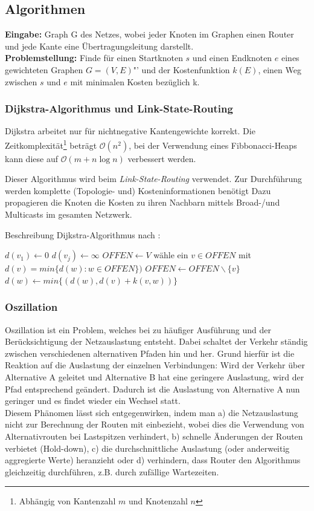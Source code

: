 \documentclass{article} %
\begin{document}
\subsection{Algorithmen}
\textbf{Eingabe:} Graph G des Netzes, wobei jeder Knoten im Graphen einen Router und jede Kante eine Übertragungsleitung darstellt.\\
\textbf{Problemstellung:} Finde für einen Startknoten $s$ und einen Endknoten $e$ eines gewichteten Graphen $G = (V,E)$"' und der Kostenfunktion $k(E)$, einen Weg zwischen $s$ und $e$ mit minimalen Kosten bezüglich k.
\subsubsection{Dijkstra-Algorithmus und Link-State-Routing}
Dijkstra arbeitet nur für nichtnegative Kantengewichte korrekt. 
Die Zeitkomplexität\footnote{Abhängig von Kantenzahl $m$ und Knotenzahl $n$} beträgt $\mathcal{O}(n^2)$, bei der Verwendung eines Fibbonacci-Heaps kann diese auf $\mathcal{O}(m + n \log{n})$ verbessert werden.

Dieser Algorithmus wird beim \emph{Link-State-Routing} verwendet.
Zur Durchführung werden komplette (Topologie- und) Kosteninformationen benötigt
Dazu propagieren die Knoten die Kosten zu ihren Nachbarn mittels Broad-/und Multicasts  im gesamten Netzwerk.

Beschreibung Dijkstra-Algorithmus nach \cite{brandstadt1994graphen}:
\begin{algorithmic}
	\State $d(v_1) \gets 0$
	 $d(v_j) \gets \infty$ \EndFor
	\State $OFFEN \gets V$
		\State wähle ein $v \in OFFEN$ mit $d(v) = min\{d(w) : w \in OFFEN\})$
		\State $OFFEN \gets OFFEN \backslash \{v\}$
			$d(w) \gets min\{(d(w),d(v) + k(v,w))\}$
		\EndFor
	\EndWhile
\end{algorithmic}

\subsubsection{Oszillation} 
Oszillation ist ein Problem, welches bei zu häufiger Ausführung und der Berücksichtigung der Netzauslastung entsteht.
Dabei schaltet der Verkehr ständig zwischen verschiedenen alternativen Pfaden hin und her.
Grund hierfür ist die Reaktion auf die Auslastung der einzelnen Verbindungen: 
Wird der Verkehr über Alternative A geleitet und Alternative B hat eine geringere Auslastung, wird der Pfad entsprechend geändert.
Dadurch ist die Auslastung von Alternative A nun geringer und es findet wieder ein Wechsel statt.\\
Diesem Phänomen lässt sich entgegenwirken, indem man a) die Netzauslastung nicht zur Berechnung der Routen mit einbezieht, wobei dies die Verwendung von Alternativrouten bei Lastspitzen verhindert, b) schnelle Änderungen der Routen verbietet (Hold-down), c) die durchschnittliche Auslastung (oder anderweitig aggregierte Werte) heranzieht\cite{comer2011tcp} oder d) verhindern, dass Router den Algorithmus gleichzeitig durchführen, z.B. durch zufällige Wartezeiten.
\end{document}
